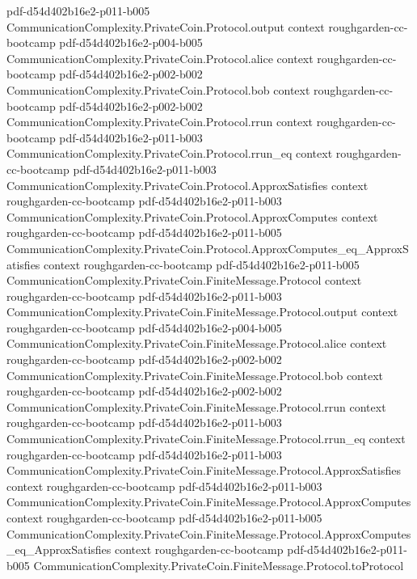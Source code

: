 \begin{theorem}
{    pdf-d54d402b16e2-p011-b005}
\proofstep
  {CommunicationComplexity.PrivateCoin.Protocol.output}
  {context}
  {roughgarden-cc-bootcamp}
  {pdf-d54d402b16e2-p004-b005}
\proofstep
  {CommunicationComplexity.PrivateCoin.Protocol.alice}
  {context}
  {roughgarden-cc-bootcamp}
  {pdf-d54d402b16e2-p002-b002}
\proofstep
  {CommunicationComplexity.PrivateCoin.Protocol.bob}
  {context}
  {roughgarden-cc-bootcamp}
  {pdf-d54d402b16e2-p002-b002}
\proofstep
  {CommunicationComplexity.PrivateCoin.Protocol.rrun}
  {context}
  {roughgarden-cc-bootcamp}
  {pdf-d54d402b16e2-p011-b003}
\proofstep
  {CommunicationComplexity.PrivateCoin.Protocol.rrun_eq}
  {context}
  {roughgarden-cc-bootcamp}
  {pdf-d54d402b16e2-p011-b003}
\proofstep
  {CommunicationComplexity.PrivateCoin.Protocol.ApproxSatisfies}
  {context}
  {roughgarden-cc-bootcamp}
  {pdf-d54d402b16e2-p011-b003}
\proofstep
  {CommunicationComplexity.PrivateCoin.Protocol.ApproxComputes}
  {context}
  {roughgarden-cc-bootcamp}
  {pdf-d54d402b16e2-p011-b005}
\proofstep
  {CommunicationComplexity.PrivateCoin.Protocol.ApproxComputes_eq_ApproxSatisfies}
  {context}
  {roughgarden-cc-bootcamp}
  {pdf-d54d402b16e2-p011-b005}
\proofstep
  {CommunicationComplexity.PrivateCoin.FiniteMessage.Protocol}
  {context}
  {roughgarden-cc-bootcamp}
  {pdf-d54d402b16e2-p011-b003}
\proofstep
  {CommunicationComplexity.PrivateCoin.FiniteMessage.Protocol.output}
  {context}
  {roughgarden-cc-bootcamp}
  {pdf-d54d402b16e2-p004-b005}
\proofstep
  {CommunicationComplexity.PrivateCoin.FiniteMessage.Protocol.alice}
  {context}
  {roughgarden-cc-bootcamp}
  {pdf-d54d402b16e2-p002-b002}
\proofstep
  {CommunicationComplexity.PrivateCoin.FiniteMessage.Protocol.bob}
  {context}
  {roughgarden-cc-bootcamp}
  {pdf-d54d402b16e2-p002-b002}
\proofstep
  {CommunicationComplexity.PrivateCoin.FiniteMessage.Protocol.rrun}
  {context}
  {roughgarden-cc-bootcamp}
  {pdf-d54d402b16e2-p011-b003}
\proofstep
  {CommunicationComplexity.PrivateCoin.FiniteMessage.Protocol.rrun_eq}
  {context}
  {roughgarden-cc-bootcamp}
  {pdf-d54d402b16e2-p011-b003}
\proofstep
  {CommunicationComplexity.PrivateCoin.FiniteMessage.Protocol.ApproxSatisfies}
  {context}
  {roughgarden-cc-bootcamp}
  {pdf-d54d402b16e2-p011-b003}
\proofstep
  {CommunicationComplexity.PrivateCoin.FiniteMessage.Protocol.ApproxComputes}
  {context}
  {roughgarden-cc-bootcamp}
  {pdf-d54d402b16e2-p011-b005}
\proofstep
  {CommunicationComplexity.PrivateCoin.FiniteMessage.Protocol.ApproxComputes_eq_ApproxSatisfies}
  {context}
  {roughgarden-cc-bootcamp}
  {pdf-d54d402b16e2-p011-b005}
\proofstep
  {CommunicationComplexity.PrivateCoin.FiniteMessage.Protocol.toProtocol}

\end{theorem}
